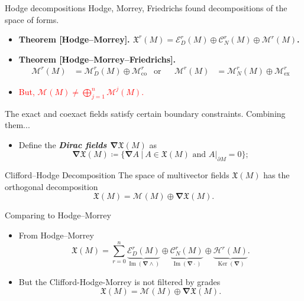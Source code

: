 \documentclass[aspectratio=169,handout]{beamer}
\newcommand\boldgreen[1]{\textcolor{lighter_csu_green}{\emph{\textbf{#1}}}}
\newcommand\boldgold[1]{\textcolor{csu_gold}{\textbf{#1}}}
\newcommand{\grad}{\boldsymbol{\nabla}}
\newcommand{\monogenics}{\mathcal{M}}
\newcommand{\boundary}{{\partial M}}
\newcommand{\monogenicfields}[1]{\mathcal{M}^{#1}(M)}
\newcommand{\smoothfields}{\mathfrak{X}}
\begin{document}
\begin{frame}{Hodge decompositions}
\vfill
Hodge, Morrey, Friedrichs found decompositions of the space of forms.
\begin{itemize}
  \pause
  \item \boldgold{Theorem [Hodge--Morrey]. $\smoothfields^r(M) = \mathcal{E}_D^r(M) \oplus \mathcal{C}_N^r(M) \oplus \monogenics^r(M)$.}
  \pause
  \item \boldgold{Theorem [Hodge--Morrey--Friedrichs].
  \begin{align*}
  \monogenics^r(M) &= \monogenics^r_D(M) \oplus \monogenics^r_{\textrm{co}} &\textrm{or} && \monogenics^r(M) &= \monogenics^r_N(M) \oplus \monogenics^r_{\textrm{ex}}
  \end{align*}
  }
  \pause
  \item \textcolor{red}{But, $\monogenicfields{} \neq \bigoplus_{j=1}^n \monogenicfields{j}$.}
\end{itemize}
\vfill
\end{frame}

\begin{frame}{}
\vfill
The exact and coexact fields satisfy certain boundary constraints. Combining them...
\begin{itemize}
  \pause
  \item Define the \boldgreen{Dirac fields $\grad \smoothfields(M)$} as
  \[
      \grad \smoothfields(M) \coloneqq \{ \grad A ~\vert~ A \in \smoothfields(M) \textrm{~and~} A\vert_\boundary = 0\};
  \]
\end{itemize}
\vfill
\end{frame}


\begin{frame}{}
\vfill
\begin{thm*}{Clifford--Hodge Decomposition}{}
The space of multivector fields $\smoothfields(M)$ has the orthogonal decomposition
\[
\smoothfields(M) = \monogenicfields{} \oplus \grad \smoothfields(M).
\]
\end{thm*}
\vfill
\end{frame}

\begin{frame}{Comparing to Hodge--Morrey}
\vfill
\begin{itemize}
\pause
\item From Hodge--Morrey
\[
\smoothfields(M) = \sum_{r=0}^n \underbrace{\mathcal{E}_D^r(M)}_{\operatorname{Im}(\grad \wedge)} \oplus \underbrace{\mathcal{C}_N^r(M)}_{\operatorname{Im}(\grad \cdot)} \oplus \underbrace{\mathcal{H}^r(M)}_{\operatorname{Ker}(\grad)}.
\]
\pause
\item But the Clifford-Hodge-Morrey is not filtered by grades
\[
\smoothfields(M) = \monogenicfields{} \oplus \grad \smoothfields(M).
\]
\end{itemize}
\vfill
\end{frame}
\end{document}

